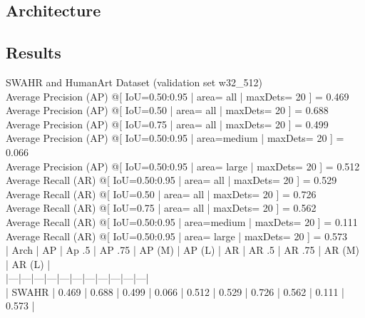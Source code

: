 \subsection{Architecture}
\label{sec:baseline_human_art_architecture}

\subsection{Results}
\label{sec:baseline_human_art_results}

SWAHR and HumanArt Dataset (validation set w32\_512)\\
Average Precision  (AP) @[ IoU=0.50:0.95 | area=   all | maxDets= 20 ] = 0.469\\
 Average Precision  (AP) @[ IoU=0.50      | area=   all | maxDets= 20 ] = 0.688\\
 Average Precision  (AP) @[ IoU=0.75      | area=   all | maxDets= 20 ] = 0.499\\
 Average Precision  (AP) @[ IoU=0.50:0.95 | area=medium | maxDets= 20 ] = 0.066\\
 Average Precision  (AP) @[ IoU=0.50:0.95 | area= large | maxDets= 20 ] = 0.512\\
 Average Recall     (AR) @[ IoU=0.50:0.95 | area=   all | maxDets= 20 ] = 0.529\\
 Average Recall     (AR) @[ IoU=0.50      | area=   all | maxDets= 20 ] = 0.726\\
 Average Recall     (AR) @[ IoU=0.75      | area=   all | maxDets= 20 ] = 0.562\\
 Average Recall     (AR) @[ IoU=0.50:0.95 | area=medium | maxDets= 20 ] = 0.111\\
 Average Recall     (AR) @[ IoU=0.50:0.95 | area= large | maxDets= 20 ] = 0.573\\
| Arch | AP | Ap .5 | AP .75 | AP (M) | AP (L) | AR | AR .5 | AR .75 | AR (M) | AR (L) |\\
|---|---|---|---|---|---|---|---|---|---|---|\\
| SWAHR | 0.469 | 0.688 | 0.499 | 0.066 | 0.512 | 0.529 | 0.726 | 0.562 | 0.111 | 0.573 |\\

